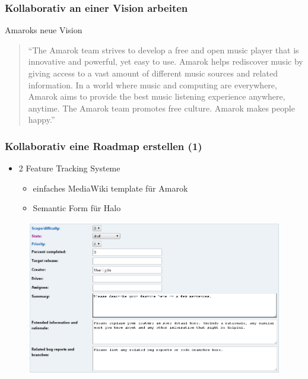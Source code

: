 \documentclass{beamer}
\begin{document}
\begin{frame}
\frametitle{Kollaborativ an einer Vision arbeiten}
\begin{block}{Amaroks neue Vision}
\begin{quotation}``The Amarok team strives to develop a free and open music player that is innovative and powerful, yet easy to use. Amarok helps rediscover music by giving access to a vast amount of different music sources and related information. In a world where music and computing are everywhere, Amarok aims to provide the best music listening experience anywhere, anytime. The Amarok team promotes free culture. Amarok makes people happy.''\end{quotation}
\end{block}
\end{frame}

\begin{frame}
\frametitle{Kollaborativ eine Roadmap erstellen (1)}
\begin{itemize}
 \item 2 Feature Tracking Systeme
 \begin{itemize}
   \item einfaches MediaWiki template f\"ur Amarok
   \item Semantic Form f\"ur Halo
 \end{itemize}
\end{itemize}
\begin{figure}
 \includegraphics[scale=0.25,keepaspectratio=true]{./featuretrackingform.png}
\end{figure}
\end{frame}
\end{document}
